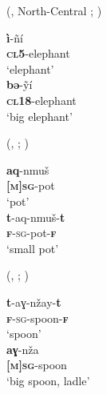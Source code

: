 \documentclass[output=collectionpaper]{langsci/langscibook}
\begin{document}
%

\ea\label{ex:WDG:33}
 (, North-Central ; \citealt[160]{Santos1996}) \\
\begin{xlist}
\ex
\gll	\textbf{ì}-ñí \\
	\textbf{\textsc{cl}5}-elephant \\
\glt 	`elephant' \\
\ex
\gll 	\textbf{bə}-ỹí \\
	\textbf{\textsc{cl}18}-elephant\\
\glt	`big elephant' \\
\end{xlist}
\z

\ea\label{ex:WDG:34}
 (, ; \citealt[12]{Penchoen1973a})  \\
\begin{xlist}
\ex
\gll \textbf{aq}-nmuš \\
	\textbf{\textsc{[m]sg}}-pot \\
\glt	`pot' \\
\ex
\gll	\textbf{t}-aq-nmuš-\textbf{t} \\
	\textsc{\textbf{f}-sg}-pot-\textbf{\textsc{f}} \\
\glt  	`small pot' \\
\end{xlist}
\z

\ea\label{ex:WDG:35}
 (, ; \citealt[12]{Penchoen1973a})\\
\begin{xlist}
\ex
\gll	\textbf{t}-aɣ-nžay-\textbf{t} \\
	\textsc{\textbf{f}-sg}-spoon-\textbf{\textsc{f}} \\
\glt	`spoon' \\
\ex
\gll 	\textbf{aɣ}-nža \\
\textbf{\textsc{[m]sg}}-spoon \\
\glt	`big spoon, ladle' \\
\end{xlist}
\z
\end{document}
